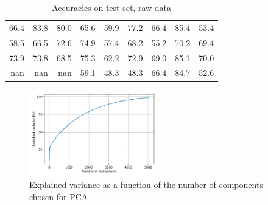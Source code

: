 \documentclass[10pt,conference,compsocconf]{IEEEtran}
\begin{document}
\begin{table}[H]
	\centering
	\begin{tabular}{rrrrrrrrr}
		\hline
		66.4 &  83.8 &  80.0 & 65.6 & 59.9 & 77.2 & 66.4 & 85.4 & 53.4 \\
		58.5 &  66.5 &  72.6 & 74.9 & 57.4 & 68.2 & 55.2 & 70.2 & 69.4 \\
		73.9 &  73.8 &  68.5 & 75.3 & 62.2 & 72.9 & 69.0 & 85.1 & 70.0 \\
		nan   & nan   & nan   & 59.1 & 48.3 & 48.3 & 66.4 & 84.7 & 52.6 \\
		\hline
	\end{tabular}
	\caption{Accuracies on test set, raw data}
\end{table}

\begin{figure}[H]
	\centering
	\includegraphics[width=0.5\textwidth]{pca_explvar.png}
	\caption{Explained variance as a function of the number of components chosen for PCA}
	\label{fig:explvar}
\end{figure}
	
\end{document}

